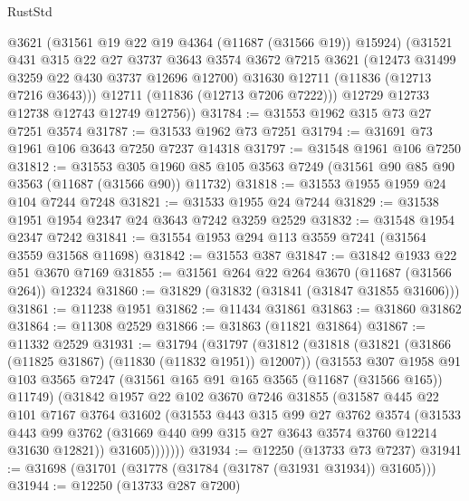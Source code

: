 \begin{lexlean}{RustStd}
\begin{coremodule}
          @3621
          (@31561 @19 @22 @19 @4364 (@11687 (@31566 @19)) @15924)
          (@31521
            @431
            @315
            @22
            @27
            @3737
            @3643
            @3574
            @3672
            @7215
            @3621
            (@12473 @31499 @3259 @22 @430 @3737 @12696 @12700)
            @31630
            @12711
            (@11836 (@12713 @7216 @3643)))
          @12711
          (@11836 (@12713 @7206 @7222)))
        @12729
        @12733
        @12738
        @12743
        @12749
        @12756))
@31784 := @31553 @1962 @315 @73 @27 @7251 @3574
@31787 := @31533 @1962 @73 @7251
@31794 := @31691 @73 @1961 @106 @3643 @7250 @7237 @14318
@31797 := @31548 @1961 @106 @7250
@31812 := @31553
    @305
    @1960
    @85
    @105
    @3563
    @7249
    (@31561 @90 @85 @90 @3563 (@11687 (@31566 @90)) @11732)
@31818 := @31553 @1955 @1959 @24 @104 @7244 @7248
@31821 := @31533 @1955 @24 @7244
@31829 := @31538 @1951 @1954 @2347 @24 @3643 @7242 @3259 @2529
@31832 := @31548 @1954 @2347 @7242
@31841 := @31554 @1953 @294 @113 @3559 @7241 (@31564 @3559 @31568 @11698)
@31842 := @31553 @387
@31847 := @31842 @1933 @22 @51 @3670 @7169
@31855 := @31561 @264 @22 @264 @3670 (@11687 (@31566 @264)) @12324
@31860 := @31829 (@31832 (@31841 (@31847 @31855 @31606)))
@31861 := @11238 @1951
@31862 := @11434 @31861
@31863 := @31860 @31862
@31864 := @11308 @2529
@31866 := @31863 (@11821 @31864)
@31867 := @11332 @2529
@31931 := @31794
    (@31797
      (@31812
        (@31818
          (@31821 (@31866 (@11825 @31867) (@11830 (@11832 @1951)) @12007))
          (@31553
            @307
            @1958
            @91
            @103
            @3565
            @7247
            (@31561 @165 @91 @165 @3565 (@11687 (@31566 @165)) @11749)
            (@31842
              @1957
              @22
              @102
              @3670
              @7246
              @31855
              (@31587
                @445
                @22
                @101
                @7167
                @3764
                @31602
                (@31553
                  @443
                  @315
                  @99
                  @27
                  @3762
                  @3574
                  (@31533
                    @443
                    @99
                    @3762
                    (@31669 @440 @99 @315 @27 @3643 @3574 @3760 @12214 @31630 @12821))
                  @31605)))))))
@31934 := @12250 (@13733 @73 @7237)
@31941 := @31698 (@31701 (@31778 (@31784 (@31787 (@31931 @31934)) @31605)))
@31944 := @12250 (@13733 @287 @7200)

\end{coremodule}
\end{lexlean}

